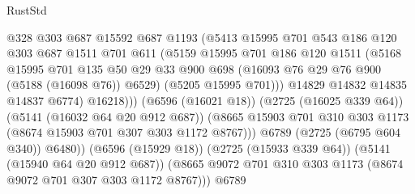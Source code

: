 \begin{lexlean}{RustStd}
\begin{coremodule}
                                  @328
                                  @303
                                  @687
                                  @15592
                                  @687
                                  @1193
                                  (@5413
                                    @15995
                                    @701
                                    @543
                                    @186
                                    @120
                                    @303
                                    @687
                                    @1511
                                    @701
                                    @611
                                    (@5159
                                      @15995
                                      @701
                                      @186
                                      @120
                                      @1511
                                      (@5168
                                        @15995
                                        @701
                                        @135
                                        @50
                                        @29
                                        @33
                                        @900
                                        @698
                                        (@16093 @76 @29 @76 @900 (@5188 (@16098 @76)) @6529)
                                        (@5205 @15995 @701)))
                                    @14829
                                    @14832
                                    @14835
                                    @14837
                                    @6774)
                                  @16218)))
                            (@6596 (@16021 @18))
                            (@2725 (@16025 @339 @64))
                            (@5141 (@16032 @64 @20 @912 @687))
                            (@8665
                              @15903
                              @701
                              @310
                              @303
                              @1173
                              (@8674 @15903 @701 @307 @303 @1172 @8767)))
                          @6789
                          (@2725 (@6795 @604 @340))
                          @6480))
                      (@6596 (@15929 @18))
                      (@2725 (@15933 @339 @64))
                      (@5141 (@15940 @64 @20 @912 @687))
                      (@8665 @9072 @701 @310 @303 @1173 (@8674 @9072 @701 @307 @303 @1172 @8767)))
                    @6789

\end{coremodule}
\end{lexlean}
